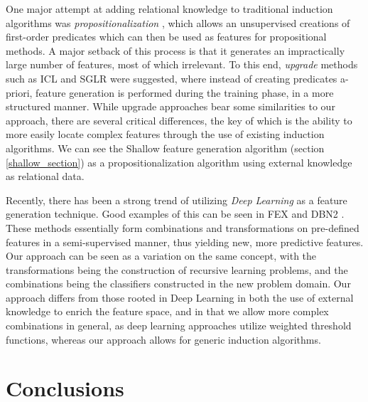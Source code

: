 \documentclass[twoside,11pt]{article}
\theoremstyle{definition}
\begin{document}
One major attempt at adding relational knowledge to traditional induction algorithms was \emph{propositionalization} \cite{kramer2000bottom}, which allows an unsupervised creations of first-order predicates which can then be used as features for propositional methods. A major setback of this process is that it generates an impractically large number of features, most of which irrelevant.  To this end, \emph{upgrade} methods such as ICL \cite{van2001upgrade} and SGLR \cite{popescul200716} were suggested, where instead of creating predicates a-priori, feature generation is performed during the training phase, in a more structured manner. While upgrade approaches bear some similarities to our approach, there are several critical differences, the key of which is the ability to more easily locate complex features through the use of existing induction algorithms.
We can see the Shallow feature generation algorithm (section \ref{shallow_section}) as a propositionalization algorithm using external knowledge as relational data.

Recently, there has been a strong trend of utilizing \emph{Deep Learning} \cite{lecun1998gradient,bengio2009learning} as a feature generation technique. Good examples of this can be seen in FEX \cite{plotz2011featurefull} and DBN2 \cite{kim2013deepfull}. These methods essentially form combinations and transformations on pre-defined features in a semi-supervised manner, thus yielding new, more predictive features. Our approach can be seen as a variation on the same concept, with the transformations being the construction of recursive learning problems, and the combinations being the classifiers constructed in the new problem domain. Our approach differs from those rooted in Deep Learning in both the use of external knowledge to enrich the feature space, and in that we allow more complex combinations in general, as deep learning approaches utilize weighted threshold functions, whereas our approach allows for generic induction algorithms.



\section{Conclusions}
\end{document}
